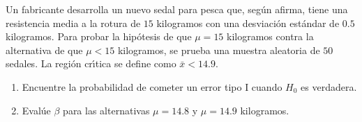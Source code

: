 \begin{enunciado}
 Un fabricante desarrolla un nuevo sedal para pesca que, seg\'un afirma, tiene una resistencia media a la rotura de $15$ kilogramos con una desviaci\'on est\'andar de $0.5$ kilogramos. Para probar la hip\'otesis de que $\mu = 15$ kilogramos contra la alternativa de que $\mu < 15$ kilogramos, se prueba una muestra aleatoria de $50$ sedales. La regi\'on cr\'{\i}tica se define como $\bar{x} < 14.9$.
 \begin{enumerate}
  \item Encuentre la probabilidad de cometer un error tipo I cuando $H_0$ es verdadera.
  
  \item Eval\'ue $\beta$ para las alternativas $\mu = 14.8$ y $\mu = 14.9$ kilogramos.
 \end{enumerate}
\end{enunciado}

